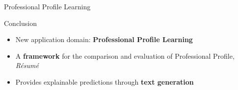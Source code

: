 \begin{section}[PPL]{Professional Profile Learning}
    \begin{frame}{Conclusion}
        \begin{itemize}
            \item New application domain: \textbf{Professional Profile Learning}
            \item A \textbf{framework} for the comparison and evaluation of Professional Profile, \textit{Résumé}
            \item Provides explainable predictions through \textbf{text generation}
        \end{itemize}
    \end{frame}
\end{section}


